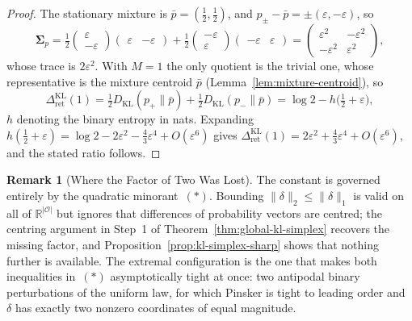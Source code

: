 \documentclass[12pt]{article}
\theoremstyle{definition}
\newtheorem{remark}[theorem]{Remark}
\newcommand{\RetKL}{\Delta_{\mathrm{ret}}^{\mathrm{KL}}}
\begin{document}
\begin{proof}
The stationary mixture is $\bar p=(\tfrac12,\tfrac12)$, and
$p_\pm-\bar p=\pm(\varepsilon,-\varepsilon)$, so
\[
\bm{\Sigma}_p
=
\tfrac12\begin{pmatrix}\varepsilon\\-\varepsilon\end{pmatrix}
\begin{pmatrix}\varepsilon&-\varepsilon\end{pmatrix}
+
\tfrac12\begin{pmatrix}-\varepsilon\\\varepsilon\end{pmatrix}
\begin{pmatrix}-\varepsilon&\varepsilon\end{pmatrix}
=
\begin{pmatrix}\varepsilon^2&-\varepsilon^2\\-\varepsilon^2&\varepsilon^2\end{pmatrix},
\]
whose trace is $2\varepsilon^2$.  With $M=1$ the only quotient is the trivial
one, whose representative is the mixture centroid $\bar p$
(Lemma~\ref{lem:mixture-centroid}), so
\[
\RetKL(1)
=
\tfrac12D_{\mathrm{KL}}(p_+\|\bar p)+\tfrac12D_{\mathrm{KL}}(p_-\|\bar p)
=
\log2-h\bigl(\tfrac12+\varepsilon\bigr),
\]
$h$ denoting the binary entropy in nats.  Expanding
$h(\tfrac12+\varepsilon)=\log2-2\varepsilon^2-\tfrac43\varepsilon^4+O(\varepsilon^6)$
gives $\RetKL(1)=2\varepsilon^2+\tfrac43\varepsilon^4+O(\varepsilon^6)$, and the
stated ratio follows.
\end{proof}

\begin{remark}[Where the Factor of Two Was Lost]
\label{rem:kl-simplex-constant}
The constant is governed entirely by the quadratic minorant~$(*)$.  Bounding
$\|\delta\|_2\le\|\delta\|_1$ is valid on all of $\mathbb R^{|\mathcal O|}$ but
ignores that differences of probability vectors are centred; the centring
argument in Step~1 of Theorem~\ref{thm:global-kl-simplex} recovers the missing
factor, and Proposition~\ref{prop:kl-simplex-sharp} shows that nothing further
is available.  The extremal configuration is the one that makes both
inequalities in~$(*)$ asymptotically tight at once: two antipodal binary
perturbations of the uniform law, for which Pinsker is tight to leading order
and $\delta$ has exactly two nonzero coordinates of equal magnitude.
\end{remark}
\end{document}
